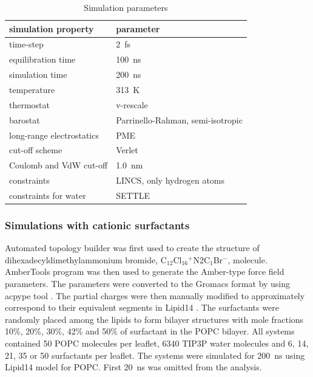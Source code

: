 \documentclass[aip,jcp,twocolumn]{revtex4}
\begin{document}
\begin{table}[btp]
  \caption{Simulation parameters}
  \label{tbl:mdpar}
  \begin{tabular}{ll}
    simulation property & parameter   \\
    \hline
    time-step           & 2~fs         \\
    equilibration time  & 100~ns  \\
    simulation time     & 200~ns  \\
    temperature         & 313~K       \\
    thermostat          & v-rescale  \cite{bussi07}   \\
    barostat            & Parrinello-Rahman, semi-isotropic \cite{parrinello81} \\
    long-range electrostatics & PME  \cite{darden93}  \\
    cut-off scheme      & Verlet \cite{Pall13}      \\
    Coulomb and VdW cut-off & 1.0~nm \\
    constraints         & LINCS, only hydrogen atoms \cite{hess97} \\
    constraints for water & SETTLE  \cite{miyamoto92} \\
    \hline
  \end{tabular}
\end{table}


\subsubsection{Simulations with cationic surfactants}
Automated topology builder \cite{malde11} was first used to create the structure of
dihexadecyldimethylammonium bromide, C$_{12}$Cl$_{16}$$^+$N2C$_1$Br$^-$, molecule.
AmberTools program \cite{amber} was then used to generate the Amber-type force field
parameters. The parameters were converted to the Gromacs format by using
acpype tool \cite{acpype}. The partial charges were then manually modified
to approximately correspond to their equivalent segments in Lipid14 \cite{dickson14}.
The surfactants were randomly placed among the lipids to form bilayer structures with
mole fractions 10\%, 20\%, 30\%, 42\% and 50\% of surfactant in the POPC bilayer.
All systems contained 50 POPC molecules per leaflet, 6340 TIP3P water molecules and
6, 14, 21, 35 or 50 surfactants per leaflet.
The systems were simulated for 200~ns using Lipid14 model for POPC.
First 20~ns was omitted from the analysis. 
\end{document}
